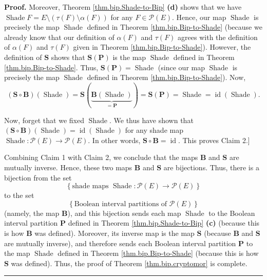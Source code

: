 \documentclass[numbers=enddot,12pt,final,onecolumn]{scrartcl}%
\theoremstyle{definition}
\newenvironment{proof}[1][Proof]{\noindent\textbf{#1.} }{\ \rule{0.5em}{0.5em}}
\newenvironment{verlong}{}{}
\begin{document}
\begin{verlong}
\begin{proof}
Moreover, Theorem \ref{thm.bip.Shade-to-Bip} \textbf{(d)} shows that we have
$\operatorname*{Shade}F=E\setminus\left(  \tau\left(  F\right)  \setminus
\alpha\left(  F\right)  \right)  $ for any $F\in\mathcal{P}\left(  E\right)
$. Hence, our map $\operatorname*{Shade}$ is precisely the map
$\operatorname*{Shade}$ defined in Theorem \ref{thm.bip.Bip-to-Shade} (because
we already know that our definition of $\alpha\left(  F\right)  $ and
$\tau\left(  F\right)  $ agrees with the definition of $\alpha\left(
F\right)  $ and $\tau\left(  F\right)  $ given in Theorem
\ref{thm.bip.Bip-to-Shade}). However, the definition of $\mathbf{S}$ shows
that $\mathbf{S}\left(  \mathbf{P}\right)  $ is the map $\operatorname*{Shade}%
$ defined in Theorem \ref{thm.bip.Bip-to-Shade}. Thus, $\mathbf{S}\left(
\mathbf{P}\right)  =\operatorname*{Shade}$ (since our map
$\operatorname*{Shade}$ is precisely the map $\operatorname*{Shade}$ defined
in Theorem \ref{thm.bip.Bip-to-Shade}). Now,%
\[
\left(  \mathbf{S}\circ\mathbf{B}\right)  \left(  \operatorname*{Shade}%
\right)  =\mathbf{S}\left(  \underbrace{\mathbf{B}\left(
\operatorname*{Shade}\right)  }_{=\mathbf{P}}\right)  =\mathbf{S}\left(
\mathbf{P}\right)  =\operatorname*{Shade}=\operatorname*{id}\left(
\operatorname*{Shade}\right)  .
\]


Now, forget that we fixed $\operatorname*{Shade}$. We thus have shown that
$\left(  \mathbf{S}\circ\mathbf{B}\right)  \left(  \operatorname*{Shade}%
\right)  =\operatorname*{id}\left(  \operatorname*{Shade}\right)  $ for any
shade map $\operatorname*{Shade}:\mathcal{P}\left(  E\right)  \rightarrow
\mathcal{P}\left(  E\right)  $. In other words, $\mathbf{S}\circ
\mathbf{B}=\operatorname*{id}$. This proves Claim 2.]

Combining Claim 1 with Claim 2, we conclude that the maps $\mathbf{B}$ and
$\mathbf{S}$ are mutually inverse. Hence, these two maps $\mathbf{B}$ and
$\mathbf{S}$ are bijections. Thus, there is a bijection from the set%
\[
\left\{  \text{shade maps }\operatorname*{Shade}:\mathcal{P}\left(  E\right)
\rightarrow\mathcal{P}\left(  E\right)  \right\}
\]
to the set%
\[
\left\{  \text{Boolean interval partitions of }\mathcal{P}\left(  E\right)
\right\}
\]
(namely, the map $\mathbf{B}$), and this bijection sends each map
$\operatorname*{Shade}$ to the Boolean interval partition $\mathbf{P}$ defined
in Theorem \ref{thm.bip.Shade-to-Bip}\textbf{ (c)} (because this is how
$\mathbf{B}$ was defined). Moreover, its inverse map is the map $\mathbf{S}$
(because $\mathbf{B}$ and $\mathbf{S}$ are mutually inverse), and therefore
sends each Boolean interval partition $\mathbf{P}$ to the map
$\operatorname*{Shade}$ defined in Theorem \ref{thm.bip.Bip-to-Shade} (because
this is how $\mathbf{S}$ was defined). Thus, the proof of Theorem
\ref{thm.bip.cryptomor} is complete.
\end{proof}
\end{verlong}
\end{document}
